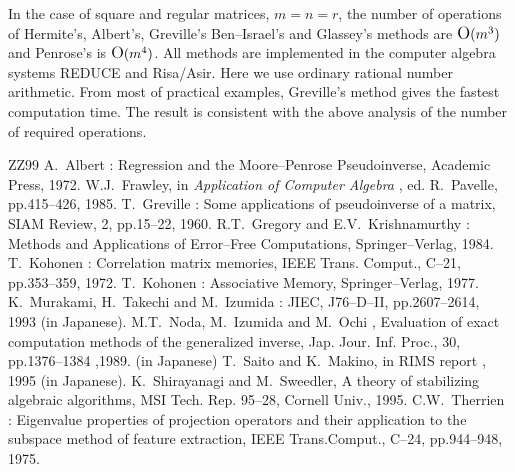 In the case of square and regular matrices, $m=n=r $, 
the number of operations of Hermite's, 
Albert's, Greville's Ben--Israel's and Glassey's methods 
are $\mbox{\large O}(m^3) $ and Penrose's is 
$\mbox{\large O}(m^4) $.  All methods are implemented in 
the computer algebra systems REDUCE and Risa/Asir.  
Here we use ordinary rational number arithmetic.  
From most of practical examples, Greville's method 
gives the fastest computation time.  The result is 
consistent with the above analysis of the number of 
required operations.

\begin{thebibliography}{ZZ99} 
 A.~Albert : Regression and the Moore--Penrose
Pseudoinverse, Academic Press, 1972. 
 W.J.~Frawley, in {\it Application of Computer
Algebra }, ed. R.~Pavelle, pp.415--426, 1985.
 T.~Greville : Some applications of 
pseudoinverse of a matrix, SIAM Review, 2, pp.15--22,
1960. R.T.~Gregory and E.V.~Krishnamurthy : 
Methods and Applications of Error--Free Computations, 
Springer--Verlag, 1984.
 T.~Kohonen : Correlation matrix memories, IEEE
Trans. Comput., C--21, pp.353--359, 1972.
 T.~Kohonen : Associative Memory, 
Springer--Verlag, 1977.
 K.~Murakami, H.~Takechi and M.~Izumida : JIEC,
J76--D--II, pp.2607--2614, 1993 (in Japanese).
 M.T.~Noda, M.~Izumida and M.~Ochi , 
Evaluation of exact computation methods of the generalized
inverse, Jap. Jour. Inf. Proc., 30, pp.1376--1384 ,1989. (in
Japanese)
 T.~Saito and K.~Makino, in RIMS report , 
1995 (in Japanese).
 K.~Shirayanagi and M.~Sweedler, A theory of
stabilizing algebraic algorithms, MSI Tech. Rep. 95--28, Cornell
Univ., 1995.
 C.W.~Therrien : Eigenvalue properties of 
projection operators and their application to the subspace method
of feature extraction, IEEE Trans.Comput., C--24, pp.944--948,
1975.
\end{thebibliography} 


